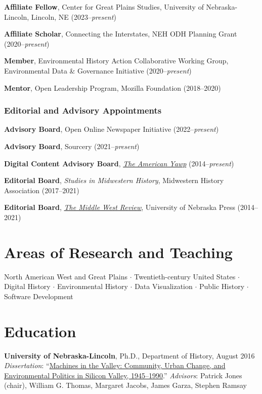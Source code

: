 \textbf{Affiliate Fellow}, Center for Great Plains Studies, University
of Nebraska-Lincoln, Lincoln, NE (2023--\emph{present})

\textbf{Affiliate Scholar}, Connecting the Interstates, NEH ODH Planning
Grant (2020--\emph{present})

\textbf{Member}, Environmental History Action Collaborative Working
Group, Environmental Data \& Governance Initiative
(2020--\emph{present})

\textbf{Mentor}, Open Leadership Program, Mozilla Foundation
(2018--2020)

\newpage

\subsubsection{Editorial and Advisory
Appointments}\label{editorial-and-advisory-appointments}

\textbf{Advisory Board}, Open Online Newspaper Initiative
(2022--\emph{present})

\textbf{Advisory Board}, Sourcery (2021--\emph{present})

\textbf{Digital Content Advisory Board},
\emph{\href{http://www.americanyawp.com/}{The American Yawp}}
(2014--\emph{present})

\textbf{Editorial Board}, \emph{Studies in Midwestern History},
Midwestern History Association (2017--2021)

\textbf{Editorial Board},
\emph{\href{https://uimiddle.wordpress.com/}{The Middle West Review}},
University of Nebraska Press (2014--2021)

\section{Areas of Research and
Teaching}\label{areas-of-research-and-teaching}

North American West and Great Plains \(\cdot\) Twentieth-century United
States \(\cdot\) Digital History \(\cdot\) Environmental History
\(\cdot\) Data Visualization \(\cdot\) Public History \(\cdot\) Software
Development

\section{Education}\label{education}

\textbf{University of Nebraska-Lincoln}, Ph.D., Department of History,
August 2016\\
\emph{Dissertation}:
``\href{http://digitalcommons.unl.edu/historydiss/86/}{Machines in the
Valley: Community, Urban Change, and Environmental Politics in Silicon
Valley, 1945--1990}.'' \emph{Advisors}: Patrick Jones (chair), William
G. Thomas, Margaret Jacobs, James Garza, Stephen Ramsay

